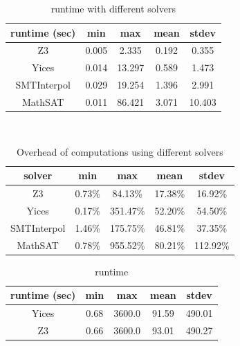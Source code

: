 \begin{table}
  \centering
  \begin{tabular}{ |c||c|c|c|c| }
    \hline
     runtime (sec) & min & max & mean & stdev \\[0.5ex]
    \hline\hline
    Z3   & 0.005 & 2.335 & 0.192 & 0.355 \\[0.5ex]
    Yices &   0.014  & 13.297   & 0.589 & 1.473 \\[0.5ex]
    SMTInterpol& 0.029 & 19.254 &  1.396 & 2.991 \\[0.5ex]
    MathSAT & 0.011 & 86.421 &  3.071 & 10.403 \\[0.5ex]
    \hline
  \end{tabular} \\
  \caption{\ucalg runtime with different solvers}
  \label{tab:runtime-ucalg}
\end{table}

\begin{table}
  \centering
  \begin{tabular}{ |c||c|c|c|c| }
    \hline
     solver & min & max & mean & stdev \\[0.5ex]
    \hline
    Z3   & 0.73\% & 84.13\% & 17.38\% & 16.92\% \\[0.5ex]
    Yices &   0.17\%  & 351.47\%   & 52.20\% & 54.50\% \\[0.5ex]
   SMTInterpol& 1.46\% & 175.75\% &  46.81\% & 37.35\%\\[0.5ex]
    MathSAT & 0.78\% & 955.52\% &  80.21\% & 112.92\%\\[0.5ex]
    \hline
  \end{tabular}
  \caption{Overhead of \ucalg computations using different solvers}
  \label{tab:overhead-ucalg}
\end{table}

\begin{table}
  \centering
  \begin{tabular}{ |c||c|c|c|c| }
    \hline
     runtime (sec) & min & max & mean & stdev \\[0.5ex]
    \hline
    Yices &   0.68  & 3600.0   & 91.59 & 490.01 \\[0.5ex]
    \hline
    Z3 &   0.66  & 3600.0   & 93.01 & 490.27 \\[0.5ex]
    \hline
  \end{tabular}
  \caption{\ucbfalg runtime}
  \label{tab:runtime-ucbfalg}
\end{table}

